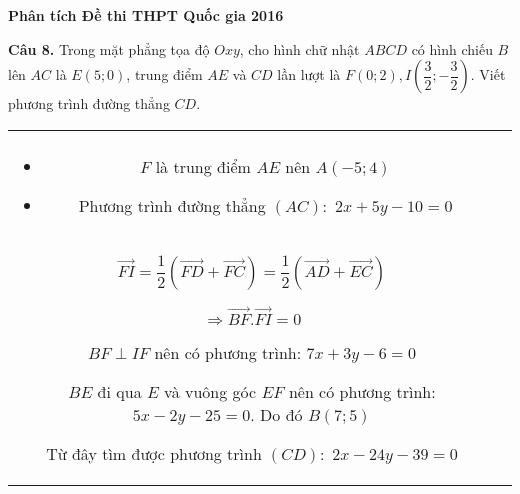 \documentclass[11pt]{beamer} %
\newcommand\Fontvi{\fontsize{9}{7.2}\selectfont}
\newcommand{\cau}[2]{\begin{block}{}
		{\color{red}\textbf{Câu #1.}} #2
	\end{block}
}
\newcommand{\divColEight}[2]{\begin{tabular}{cc}
		\begin{minipage}[c]{5.3cm} 
			#1
		\end{minipage}&
		\begin{minipage}[c]{6.4cm} 
			#2
		\end{minipage}
	\end{tabular}
}
\begin{document}
\begin{frame}{\textbf{\qquad Phân tích Đề thi THPT Quốc gia 2016}}~\\[-20pt]
	\Fontvi
	\cau{8}{Trong mặt phẳng tọa độ $Oxy$, cho hình chữ nhật $ABCD$ có hình chiếu $B$ lên $AC$ là $E(5;0)$, trung điểm $AE$ và $CD$ lần lượt là $F(0;2), I\left(\dfrac{3}{2};-\dfrac{3}{2}\right)$. Viết phương trình đường thẳng $CD$.}\pause
	\divColEight{
		\begin{center}
			
		\end{center}~\\[-20pt]
		\begin{itemize}
			\setlength{\itemindent}{-0.4cm}
			\item $F$ là trung điểm $AE$ nên $A(-5;4)$
			\item Phương trình đường thẳng $(AC):$ $2x+5y-10=0$
		\end{itemize}\pause
	}{
	\begin{itemize}
		\setlength{\itemindent}{-0.2cm}
		\item Ta đi chứng minh: $BF\perp IF$.
		\item $\overrightarrow{BF}=\dfrac{1}{2}\left(\overrightarrow{BA}+ \overrightarrow{BE}\right)$\\[8pt]
		\item $\overrightarrow{FI}=\dfrac{1}{2}\left(\overrightarrow{FD}+\overrightarrow{FC}\right)=\dfrac{1}{2}\left(\overrightarrow{AD}+\overrightarrow{EC}\right)$
		\item $\Rightarrow \overrightarrow{BF}.\overrightarrow{FI}=0$
		\item $BF\perp IF$ nên có phương trình: $7x+3y-6=0$
		\item $BE$ đi qua $E$ và vuông góc $EF$ nên có phương trình: $5x-2y-25=0$.
		Do đó $B(7;5)$	
		\item Từ đây tìm được phương trình $(CD):$ $2x-24y-39=0$
	\end{itemize}
}
\end{frame}
\end{document}
